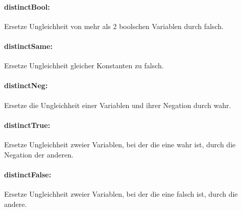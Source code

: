 \documentclass[a4paper]{article}
\begin{document}
\paragraph{distinctBool:} Ersetze Ungleichheit von mehr als 2 boolschen Variablen durch falsch.
\begin{mathpar}
\end{mathpar}

\paragraph{distinctSame:} Ersetze Ungleichheit gleicher Konstanten zu falsch.
\begin{mathpar}
\end{mathpar}

\paragraph{distinctNeg:} Ersetze die Ungleichheit einer Variablen und ihrer Negation durch wahr.
\begin{mathpar}
\end{mathpar}

\paragraph{distinctTrue:} Ersetze Ungleichheit zweier Variablen, bei der die eine wahr ist, durch die Negation der anderen.
\begin{mathpar}
\end{mathpar}

\paragraph{distinctFalse:} Ersetze Ungleichheit zweier Variablen, bei der die eine falsch ist, durch die andere.
\begin{mathpar}
\end{mathpar}
\end{document}
